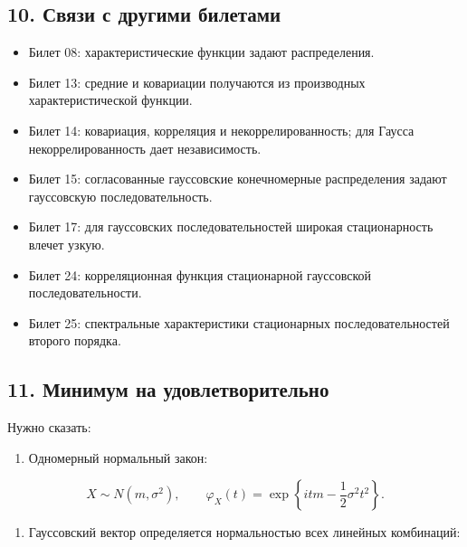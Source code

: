 \documentclass[
  11pt,
  a4paper,
]{article}
\providecommand{\tightlist}{%
  \setlength{\itemsep}{0pt}\setlength{\parskip}{0pt}}
\begin{document}
\subsection{10. Связи с другими
билетами}\label{ux441ux432ux44fux437ux438-ux441-ux434ux440ux443ux433ux438ux43cux438-ux431ux438ux43bux435ux442ux430ux43cux438}

\begin{itemize}
\tightlist
\item
  Билет 08: характеристические функции задают распределения.
\item
  Билет 13: средние и ковариации получаются из производных
  характеристической функции.
\item
  Билет 14: ковариация, корреляция и некоррелированность; для Гаусса
  некоррелированность дает независимость.
\item
  Билет 15: согласованные гауссовские конечномерные распределения задают
  гауссовскую последовательность.
\item
  Билет 17: для гауссовских последовательностей широкая стационарность
  влечет узкую.
\item
  Билет 24: корреляционная функция стационарной гауссовской
  последовательности.
\item
  Билет 25: спектральные характеристики стационарных последовательностей
  второго порядка.
\end{itemize}

\subsection{11. Минимум на
удовлетворительно}\label{ux43cux438ux43dux438ux43cux443ux43c-ux43dux430-ux443ux434ux43eux432ux43bux435ux442ux432ux43eux440ux438ux442ux435ux43bux44cux43dux43e}

Нужно сказать:

\begin{enumerate}
\def\labelenumi{\arabic{enumi}.}
\tightlist
\item
  Одномерный нормальный закон:
\end{enumerate}

\[
X\sim N(m,\sigma^2),
\qquad
\varphi_X(t)=\exp\left\{itm-\frac12\sigma^2t^2\right\}.
\]

\begin{enumerate}
\def\labelenumi{\arabic{enumi}.}
\setcounter{enumi}{1}
\tightlist
\item
  Гауссовский вектор определяется нормальностью всех линейных
  комбинаций:
\end{enumerate}
\end{document}
